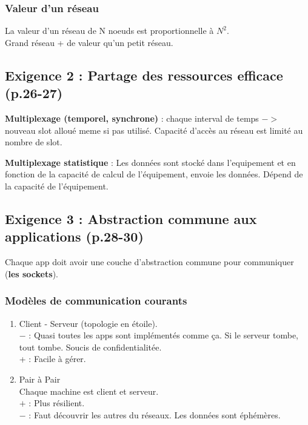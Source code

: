 \documentclass[12pt]{article}
\begin{document}
\subsubsection*{Valeur d'un réseau}
La valeur d'un réseau de N noeuds est proportionnelle à $N^{2}$. \\
Grand réseau + de valeur qu'un petit réseau.

\subsection*{Exigence 2 : Partage des ressources efficace (p.26-27)} 


\textbf{Multiplexage (temporel, synchrone)} : chaque interval de temps $->$ nouveau slot alloué meme si pas utilisé. 
Capacité d'accès au réseau est limité au nombre de slot.

\textbf{Multiplexage statistique} : Les données sont stocké dans l'equipement et en fonction de la capacité de calcul de l'équipement, envoie les données.
Dépend de la capacité de l'équipement.


\subsection*{Exigence 3 : Abstraction commune aux applications (p.28-30)}


Chaque app doit avoir une couche d'abstraction commune pour communiquer (\textbf{les sockets}).

\subsubsection*{Modèles de communication courants}
\begin{enumerate}
    \item   Client - Serveur (topologie en étoile). \\
            $-$ : Quasi toutes les apps sont implémentés comme ça.
            Si le serveur tombe, tout tombe. Soucis de confidentialitée. \\
            + : Facile à gérer.
    \item   Pair à Pair \\
            Chaque machine est client et serveur. \\
            $+$ : Plus résilient. \\
            $-$ : Faut découvrir les autres du réseaux. Les données sont éphémères.
\end{enumerate}
\end{document}
